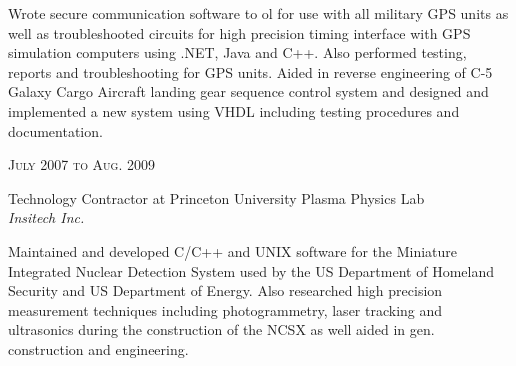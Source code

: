 \documentclass[10pt]{article} %
\begin{document}
{\begin{minipage}[t]{0.5\textwidth}
\small{Wrote secure communication software to
ol for use with all military GPS units as well as troubleshooted circuits for high precision timing interface with GPS simulation computers using .NET, Java and C++. Also performed testing, reports and troubleshooting for GPS units. Aided in reverse engineering of C-5 Galaxy Cargo Aircraft landing gear sequence control system and designed and implemented a new system using VHDL including testing procedures and documentation.}\\


{\raggedleft\textsc{July 2007 to Aug. 2009}\par}

{\raggedright\large Technology Contractor at Princeton University Plasma Physics Lab\\
\textit{Insitech Inc.}\\[5pt]}

\small{Maintained and developed C/C++ and UNIX software for the Miniature Integrated Nuclear Detection System used by the US Department of Homeland Security and US Department of Energy.  Also researched high precision measurement techniques including photogrammetry, laser tracking and ultrasonics during the construction of the NCSX as well aided in gen. construction and engineering.
}\\


%
%


%
%


\end{minipage}}
\end{document}
